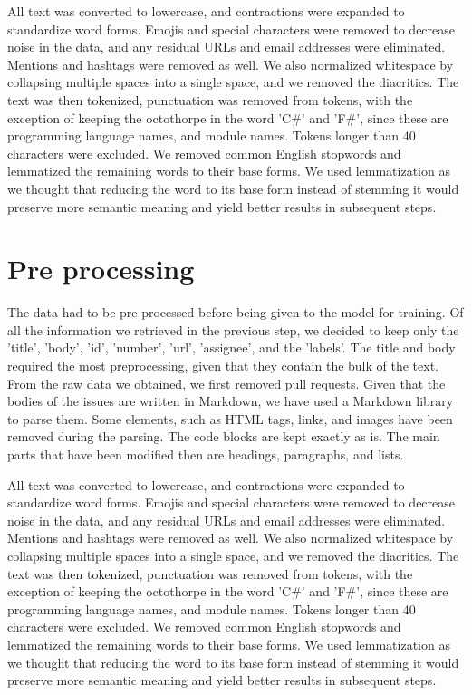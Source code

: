 \documentclass[tikz,10pt,fleqn]{article}
\begin{document}
All text was converted to lowercase, and contractions were expanded to standardize word forms. Emojis and special characters were removed to decrease noise in the data, and any residual URLs and email addresses were eliminated. Mentions and hashtags were removed as well. We also normalized whitespace by collapsing multiple spaces into a single space, and we removed the diacritics.  
The text was then tokenized, punctuation was removed from tokens, with the exception of keeping the octothorpe in the word 'C\#' and 'F\#', since these are programming language names, and module names. Tokens longer than 40 characters were excluded. We removed common English stopwords and lemmatized the remaining words to their base forms.  
We used lemmatization as we thought that reducing the word to its base form instead of stemming it would preserve more semantic meaning and yield better results in subsequent steps.

\section*{Pre processing}
The data had to be pre-processed before being given to the model for training.
Of all the information we retrieved in the previous step, we decided to keep only the 'title', 'body', 'id', 'number', 'url', 'assignee', and the 'labels'.
The title and body required the most preprocessing, given that they contain the bulk of the text.
From the raw data we obtained, we first removed pull requests.
Given that the bodies of the issues are written in Markdown, we have used a Markdown library to parse them.
Some elements, such as HTML tags, links, and images have been removed during the parsing. The code blocks are kept exactly as is.
The main parts that have been modified then are headings, paragraphs, and lists.

All text was converted to lowercase, and contractions were expanded to standardize word forms. Emojis and special characters were removed to decrease noise in the data, and any residual URLs and email addresses were eliminated. Mentions and hashtags were removed as well. We also normalized whitespace by collapsing multiple spaces into a single space, and we removed the diacritics.
The text was then tokenized, punctuation was removed from tokens, with the exception of keeping the octothorpe in the word 'C\#' and 'F\#', since these are programming language names, and module names. Tokens longer than 40 characters were excluded. We removed common English stopwords and lemmatized the remaining words to their base forms.
We used lemmatization as we thought that reducing the word to its base form instead of stemming it would preserve more semantic meaning and yield better results in subsequent steps.
\end{document}
